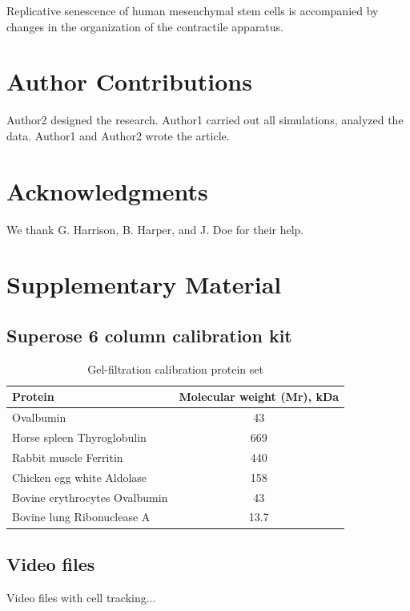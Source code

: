 \documentclass[english,authoryear]{elsarticle}
\begin{document}
Replicative senescence of human mesenchymal stem cells is accompanied by changes in the organization of the contractile apparatus.

\section*{Author Contributions}

Author2 designed the research. Author1 carried out all simulations, analyzed the data. Author1 and Author2 wrote the article.

\section*{Acknowledgments}

We thank G. Harrison, B. Harper, and J. Doe for their help.

%
%
%


\section*{Supplementary Material}

\subsection{Superose 6 column calibration kit}

\begin{table}[h]
  \caption{Gel-filtration calibration protein set}
  \label{calibration}
\centering
\begin{tabular}{l|c|}
 Protein & Molecular weight (Mr), kDa  \\
 \hline
 Ovalbumin & 43 \\
 Horse spleen Thyroglobulin & 669 \\
 Rabbit muscle Ferritin & 440 \\
 Chicken egg white Aldolase & 158 \\
 Bovine erythrocytes Ovalbumin & 43 \\
 Bovine lung Ribonuclease A & 13.7
\end{tabular}
\end{table}

\subsection*{Video files}

Video files with cell tracking...
\end{document}
